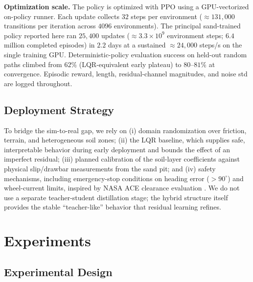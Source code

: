 \documentclass[conference]{IEEEtran}
\begin{document}
\vspace{1mm}
\noindent\textbf{Optimization scale.} The policy is optimized with PPO \cite{schulman2017proximal} using a GPU-vectorized on-policy runner. Each update collects $32$ steps per environment ($\approx 131{,}000$ transitions per iteration across $4096$ environments). The principal sand-trained policy reported here ran $25{,}400$ updates ($\approx 3.3\times10^{9}$ environment steps; $6.4$ million completed episodes) in $2.2$ days at a sustained $\approx\!24{,}000$ steps/s on the single training GPU. Deterministic-policy evaluation success on held-out random paths climbed from $62\%$ (LQR-equivalent early plateau) to $80$--$81\%$ at convergence. Episodic reward, length, residual-channel magnitudes, and noise std are logged throughout.

\subsection{Deployment Strategy}
To bridge the sim-to-real gap, we rely on (i) domain randomization over friction, terrain, and heterogeneous soil zones; (ii) the LQR baseline, which supplies safe, interpretable behavior during early deployment and bounds the effect of an imperfect residual; (iii) planned calibration of the soil-layer coefficients against physical slip/drawbar measurements from the sand pit; and (iv) safety mechanisms, including emergency-stop conditions on heading error ($>90^\circ$) and wheel-current limits, inspired by NASA ACE clearance evaluation \cite{nasaACE}. We do not use a separate teacher-student distillation stage; the hybrid structure itself provides the stable ``teacher-like'' behavior that residual learning refines.

\section{Experiments}
\subsection{Experimental Design}
\end{document}
